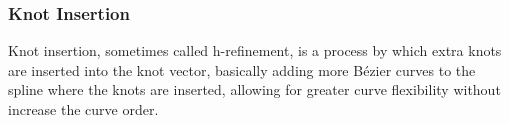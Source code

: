 
\subsubsection{Knot Insertion}
Knot insertion, sometimes called h-refinement, is a process by which extra knots are inserted into the knot vector, basically adding more Bézier curves to the spline where the knots are inserted, allowing for greater curve flexibility without increase the curve order.



 
{}


